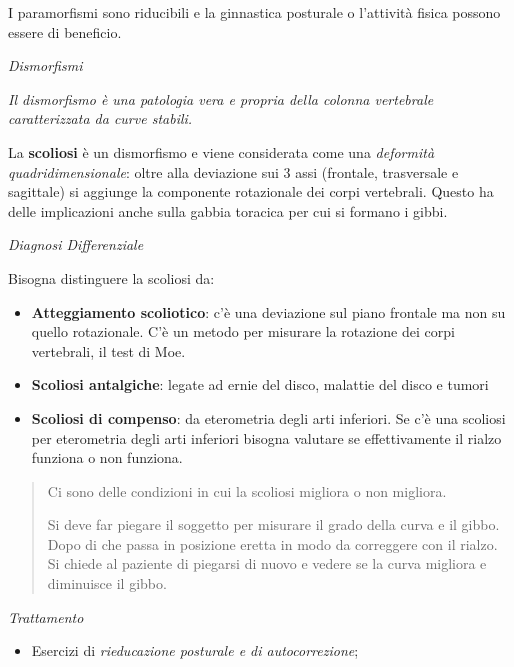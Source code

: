 \documentclass[]{article}
\begin{document}
I paramorfismi sono riducibili e la ginnastica posturale o l'attività
fisica possono essere di beneficio.

\emph{Dismorfismi}

\emph{Il dismorfismo è una patologia vera e propria della colonna
vertebrale caratterizzata da curve stabili.}

La \textbf{scoliosi} è un dismorfismo e viene considerata come una
\emph{deformità quadridimensionale}: oltre alla deviazione sui 3 assi
(frontale, trasversale e sagittale) si aggiunge la componente
rotazionale dei corpi vertebrali. Questo ha delle implicazioni anche
sulla gabbia toracica per cui si formano i gibbi.

\emph{Diagnosi Differenziale}

Bisogna distinguere la scoliosi da:

\begin{itemize}
\item
  \textbf{Atteggiamento scoliotico}: c'è una deviazione sul piano
  frontale ma non su quello rotazionale. C'è un metodo per misurare la
  rotazione dei corpi vertebrali, il test di Moe.
\end{itemize}

\begin{itemize}
\item
  \textbf{Scoliosi antalgiche}: legate ad ernie del disco, malattie del
  disco e tumori
\item
  \textbf{Scoliosi di compenso}: da eterometria degli arti inferiori. Se
  c'è una scoliosi per eterometria degli arti inferiori bisogna valutare
  se effettivamente il rialzo funziona o non funziona.
\end{itemize}

\begin{quote}
Ci sono delle condizioni in cui la scoliosi migliora o non migliora.

Si deve far piegare il soggetto per misurare il grado della curva e il
gibbo. Dopo di che passa in posizione eretta in modo da correggere con
il rialzo. Si chiede al paziente di piegarsi di nuovo e vedere se la
curva migliora e diminuisce il gibbo.
\end{quote}

\emph{Trattamento}

\begin{itemize}
\item
  Esercizi di \emph{rieducazione posturale e di autocorrezione};
\end{itemize}
\end{document}
